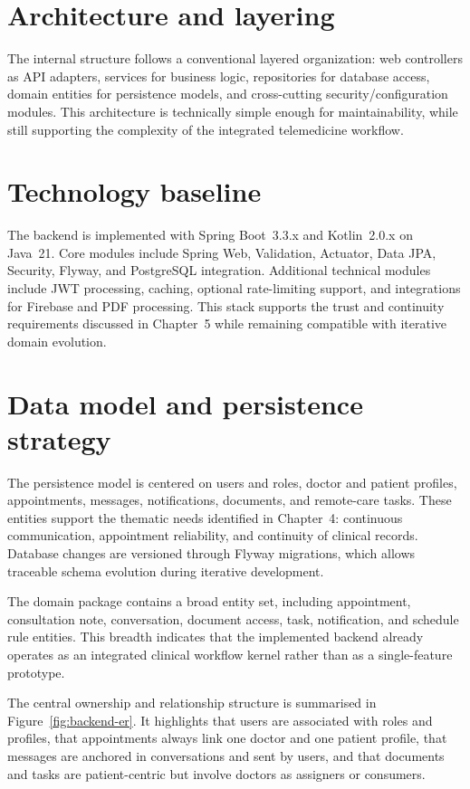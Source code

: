 \documentclass[11pt,a4paper,twoside,openany,headings=normal]{scrreprt}
\begin{document}
\section{Architecture and layering}

The internal structure follows a conventional layered organization: web controllers as API adapters, services for business logic, repositories for database access, domain entities for persistence models, and cross-cutting security/configuration modules. This architecture is technically simple enough for maintainability, while still supporting the complexity of the integrated telemedicine workflow.

\ShifaFigBackendLayers
\ShifaFigJwtFlow

\section{Technology baseline}

The backend is implemented with Spring Boot~3.3.x and Kotlin~2.0.x on Java~21. Core modules include Spring Web, Validation, Actuator, Data JPA, Security, Flyway, and PostgreSQL integration. Additional technical modules include JWT processing, caching, optional rate-limiting support, and integrations for Firebase and PDF processing. This stack supports the trust and continuity requirements discussed in Chapter~5 while remaining compatible with iterative domain evolution.

\section{Data model and persistence strategy}

The persistence model is centered on users and roles, doctor and patient profiles, appointments, messages, notifications, documents, and remote-care tasks. These entities support the thematic needs identified in Chapter~4: continuous communication, appointment reliability, and continuity of clinical records. Database changes are versioned through Flyway migrations, which allows traceable schema evolution during iterative development.

The domain package contains a broad entity set, including appointment, consultation note, conversation, document access, task, notification, and schedule rule entities. This breadth indicates that the implemented backend already operates as an integrated clinical workflow kernel rather than as a single-feature prototype.

The central ownership and relationship structure is summarised in Figure~\ref{fig:backend-er}. It highlights that users are associated with roles and profiles, that appointments always link one doctor and one patient profile, that messages are anchored in conversations and sent by users, and that documents and tasks are patient-centric but involve doctors as assigners or consumers.
\end{document}
